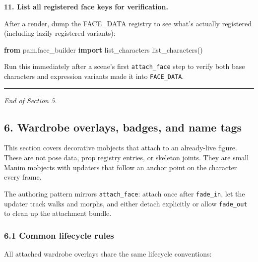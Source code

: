 \documentclass[
  11pt,
]{book}
\newenvironment{Shaded}{}{}
\newcommand{\ImportTok}[1]{\textcolor[rgb]{0.00,0.50,0.00}{\textbf{#1}}}
\newcommand{\NormalTok}[1]{#1}
\begin{document}
\textbf{11. List all registered face keys for verification.}

After a render, dump the FACE\_DATA registry to see what's actually
registered (including lazily-registered variants):

\begin{Shaded}
\begin{Highlighting}[]
\ImportTok{from}\NormalTok{ pam.face\_builder }\ImportTok{import}\NormalTok{ list\_characters}
\NormalTok{list\_characters()}
\end{Highlighting}
\end{Shaded}

Run this immediately after a scene's first \texttt{attach\_face} step to
verify both base characters and expression variants made it into
\texttt{FACE\_DATA}.

\begin{center}\rule{0.5\linewidth}{0.5pt}\end{center}

\emph{End of Section 5.}


\subsection{6. Wardrobe overlays, badges, and name
tags}\label{wardrobe-overlays-badges-and-name-tags}

This section covers decorative mobjects that attach to an already-live
figure. These are not pose data, prop registry entries, or skeleton
joints. They are small Manim mobjects with updaters that follow an
anchor point on the character every frame.

The authoring pattern mirrors \texttt{attach\_face}: attach once after
\texttt{fade\_in}, let the updater track walks and morphs, and either
detach explicitly or allow \texttt{fade\_out} to clean up the attachment
bundle.

\subsubsection{6.1 Common lifecycle rules}\label{common-lifecycle-rules}

All attached wardrobe overlays share the same lifecycle conventions:
\end{document}
